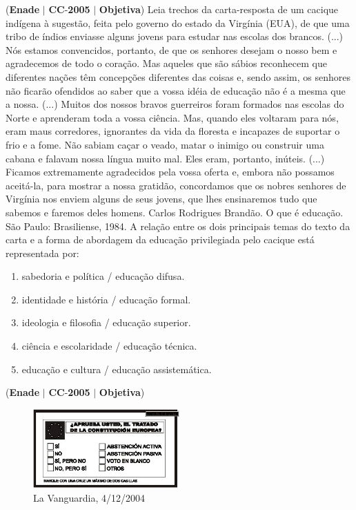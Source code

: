 \documentclass{exam}
\begin{document}
\begin{questions}
\question (\textbf{Enade} $|$ \textbf{CC}-\textbf{2005} $|$ \textbf{Objetiva})
Leia trechos da carta-resposta de um cacique indígena à sugestão, feita pelo governo do estado da Virgínia (EUA), de que uma tribo
de índios enviasse alguns jovens para estudar nas escolas dos brancos.
(...) Nós estamos convencidos, portanto, de que os senhores desejam o nosso bem e agradecemos de todo o coração. Mas
aqueles que são sábios reconhecem que diferentes nações têm concepções diferentes das coisas e, sendo assim, os senhores não
ficarão ofendidos ao saber que a vossa idéia de educação não é a mesma que a nossa. (...) Muitos dos nossos bravos guerreiros
foram formados nas escolas do Norte e aprenderam toda a vossa ciência. Mas, quando eles voltaram para nós, eram maus
corredores, ignorantes da vida da floresta e incapazes de suportar o frio e a fome. Não sabiam caçar o veado, matar o inimigo ou
construir uma cabana e falavam nossa língua muito mal. Eles eram, portanto, inúteis. (...) Ficamos extremamente agradecidos pela
vossa oferta e, embora não possamos aceitá-la, para mostrar a nossa gratidão, concordamos que os nobres senhores de Virgínia
nos enviem alguns de seus jovens, que lhes ensinaremos tudo que sabemos e faremos deles homens.
Carlos Rodrigues Brandão. O que é educação. São Paulo: Brasiliense, 1984.
A relação entre os dois principais temas do texto da carta e a forma de abordagem da educação privilegiada pelo cacique está
representada por:
	\begin{enumerate}[label=\alph*)]
		\item  sabedoria e política / educação difusa.
		\item  identidade e história / educação formal.
		\item  ideologia e filosofia / educação superior.
		\item  ciência e escolaridade / educação técnica.
		\item  educação e cultura / educação assistemática.
	\end{enumerate}

\question (\textbf{Enade} $|$ \textbf{CC}-\textbf{2005} $|$ \textbf{Objetiva})

\begin{figure}[H]
	\begin{center}
		\includegraphics[width=0.5\textwidth]{CIENCIA_DA_COMPUTACAO_Prova2005-utf8_figuras/fig-0005.jpg}
		\caption{La Vanguardia, 4/12/2004}
	\end{center}
\end{figure}


\end{questions}
\end{document}
